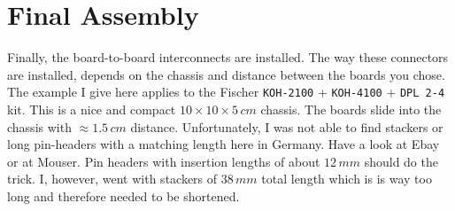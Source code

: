 \documentclass[10pt, a4paper,twoside]{scrartcl}
\begin{document}
\cleardoublepage
\section{Final Assembly} \label{sec:box}
Finally, the board-to-board interconnects are installed. The way these connectors are installed, depends on the chassis and distance between the boards you chose. The example I give here applies to the Fischer \texttt{KOH-2100} + \texttt{KOH-4100} + \texttt{DPL 2-4} kit. This is a nice and compact $10 \times 10 \times 5\,cm$ chassis. The boards slide into the chassis with $\approx 1.5\,cm$ distance. Unfortunately, I was not able to find stackers or long pin-headers with a matching length here in Germany. Have a look at Ebay or at Mouser. Pin headers with insertion lengths of about $12\,mm$ should do the trick. I, however, went with stackers of $38\,mm$ total length which is is way too long and therefore needed to be shortened.
\end{document}
